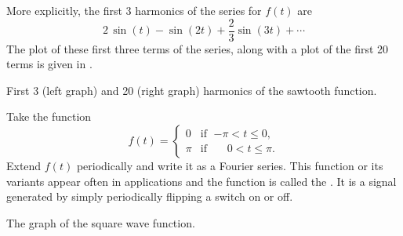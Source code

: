 \begin{example}
More explicitly,
the first 3 harmonics of the series for $f(t)$ are
\begin{equation*}
2 \, \sin (t)
- \sin (2t)
+\frac{2}{3} \sin (3t)
+ \cdots
\end{equation*}
The plot of these first three terms of the series, along with a plot
of the first 20 terms is given in
.

\begin{myfig}
\capstart
\caption{First 3 (left graph) and 20 (right graph) harmonics of the sawtooth
function.\label{ts:sawtoothfsfig}}
\end{myfig}
\end{example}

\begin{example}
Take the function
\begin{equation*}
f(t) =
\begin{cases}
0 & \text{if } \;{-\pi} < t \leq 0 , \\
\pi & \text{if } \;\phantom{-}0 < t \leq \pi .
\end{cases}
\end{equation*}
\nopagebreak[4]%
Extend $f(t)$ periodically and write it 
as a Fourier series.  This function or its variants appear often
in applications and the function is called the
\emph{}.  It is a signal
generated by simply periodically flipping a switch on or off.

\begin{myfig}
\capstart
{}
\caption{The graph of the square wave function.\label{ts:squarewavefig}}
\end{myfig}


\end{example}
